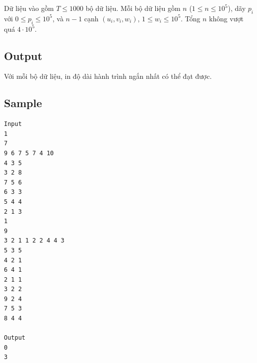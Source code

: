 \documentclass[11pt]{article}
\begin{document}
Dữ liệu vào gồm \(T\le 1000\) bộ dữ liệu. Mỗi bộ dữ liệu gồm \(n\)
(\(1\le n\le 10^5\)), dãy \(p_i\) với \(0\le p_i\le 10^5\), và \(n-1\) cạnh
\((u_i,v_i,w_i)\), \(1\le w_i\le 10^5\). Tổng \(n\) không vượt quá
\(4\cdot10^5\).

\subsection*{Output}

Với mỗi bộ dữ liệu, in độ dài hành trình ngắn nhất có thể đạt được.

\subsection*{Sample}

\begin{verbatim}
Input
1
7
9 6 7 5 7 4 10
4 3 5
3 2 8
7 5 6
6 3 3
5 4 4
2 1 3
1
9
3 2 1 1 2 2 4 4 3
5 3 5
4 2 1
6 4 1
2 1 1
3 2 2
9 2 4
7 5 3
8 4 4

Output
0
3
\end{verbatim}
\end{document}
